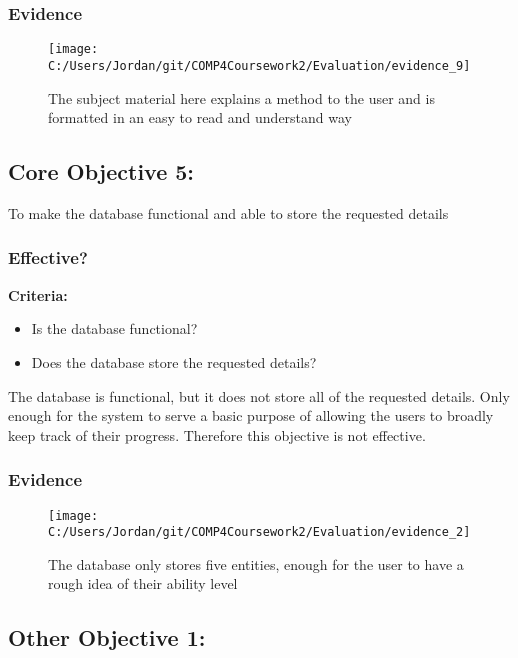 \subsubsection{Evidence}

\begin{figure}[H]
	\texttt{[image: C:/Users/Jordan/git/COMP4Coursework2/Evaluation/evidence\_9]}
	\caption{The subject material here explains a method to the user and is formatted in an easy to read and understand way}
\end{figure}

\subsection{Core Objective 5: }

To make the database functional and able to store the requested details

\subsubsection{Effective?}

\textbf{Criteria: }

\begin{itemize}
	\item Is the database functional?
	\item Does the database store the requested details?
\end{itemize}

The database is functional, but it does not store all of the requested details. Only enough for the system to serve a basic purpose of allowing the users to broadly keep track of their progress. Therefore this objective is not effective.

\subsubsection{Evidence}

\begin{figure}[H]
	\texttt{[image: C:/Users/Jordan/git/COMP4Coursework2/Evaluation/evidence\_2]}
	\caption{The database only stores five entities, enough for the user to have a rough idea of their ability level}
\end{figure}

\subsection{Other Objective 1: }

